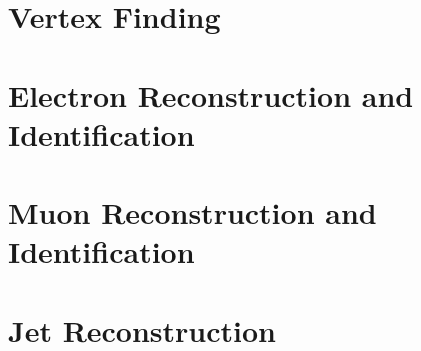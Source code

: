 \section{Vertex Finding}
\label{sec:reco-vertexing}


\section{Electron Reconstruction and Identification}
\label{sec:reco-el}


\section{Muon Reconstruction and Identification}
\label{sec:reco-mu}


\section{Jet Reconstruction}
\label{sec:reco-jet}

